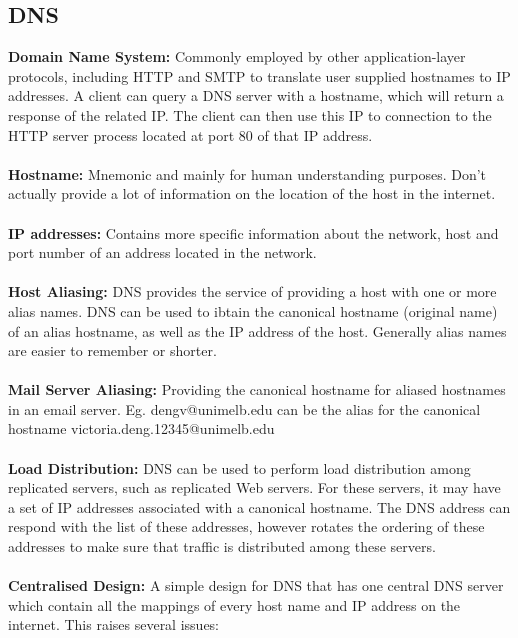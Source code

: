 \documentclass[]{article}
\begin{document}
\subsection{DNS}
\textcolor{Emerald}{\textbf{Domain Name System:}} Commonly employed by other application-layer protocols, including HTTP and SMTP to translate user supplied hostnames to IP addresses. A client can query a DNS server with a hostname, which will return a response of the related IP. The client can then use this IP to connection to the HTTP server process located at port 80 of that IP address. \\\\
\textcolor{Emerald}{\textbf{Hostname:}} Mnemonic and mainly for human understanding purposes. Don't actually provide a lot of information on the location of the host in the internet. \\\\
\textcolor{Emerald}{\textbf{IP addresses:}} Contains more specific information about the network, host and port number of an address located in the network. \\\\
\textcolor{Emerald}{\textbf{Host Aliasing:}} DNS provides the service of providing a host with one or more alias names. DNS can be used to ibtain the canonical hostname (original name) of an alias hostname, as well as the IP address of the host. Generally alias names are easier to remember or shorter. \\\\
\textcolor{Emerald}{\textbf{Mail Server Aliasing:}} Providing the canonical hostname for aliased hostnames in an email server. Eg. dengv@unimelb.edu can be the alias for the canonical hostname victoria.deng.12345@unimelb.edu \\\\
\textcolor{Emerald}{\textbf{Load Distribution:}} DNS can be used to perform load distribution among replicated servers, such as replicated Web servers.  For these servers, it may have a set of IP addresses associated with a canonical hostname. The DNS address can respond with the list of these addresses, however rotates the ordering of these addresses to make sure that traffic is distributed among these servers. \\\\
\textcolor{Emerald}{\textbf{Centralised Design:}} A simple design for DNS that has one central DNS server which contain all the mappings of every host name and IP address on the internet. This raises several issues: 
\end{document}
